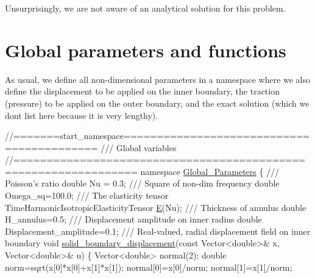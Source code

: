 Unsurprisingly, we are not aware of an analytical solution for this problem.



 

\hypertarget{index_namespace}{}\section{Global parameters and functions}\label{index_namespace}
As usual, we define all non-\/dimensional parameters in a namespace where we also define the displacement to be applied on the inner boundary, the traction (pressure) to be applied on the outer boundary, and the exact solution (which we don\textquotesingle{}t list here because it is very lengthy).

 
\begin{DoxyCodeInclude}
\textcolor{comment}{//=======start\_namespace==========================================}
\textcolor{comment}{/// Global variables}
\textcolor{comment}{}\textcolor{comment}{//================================================================}
\textcolor{keyword}{namespace }\hyperlink{namespaceGlobal__Parameters}{Global\_Parameters}
\{
\textcolor{comment}{}
\textcolor{comment}{ /// Poisson's ratio}
\textcolor{comment}{} \textcolor{keywordtype}{double} Nu = 0.3;
\textcolor{comment}{}
\textcolor{comment}{ /// Square of non-dim frequency}
\textcolor{comment}{} \textcolor{keywordtype}{double} Omega\_sq=100.0;
  \textcolor{comment}{}
\textcolor{comment}{ /// The elasticity tensor}
\textcolor{comment}{} TimeHarmonicIsotropicElasticityTensor \hyperlink{namespaceGlobal__Parameters_aeeb26e11ef275bdfce14710e00290bb6}{E}(Nu);
 \textcolor{comment}{}
\textcolor{comment}{ /// Thickness of annulus}
\textcolor{comment}{} \textcolor{keywordtype}{double} H\_annulus=0.5;
\textcolor{comment}{}
\textcolor{comment}{ /// Displacement amplitude on inner radius}
\textcolor{comment}{} \textcolor{keywordtype}{double} Displacement\_amplitude=0.1;
\textcolor{comment}{}
\textcolor{comment}{ /// Real-valued, radial displacement field on inner boundary}
\textcolor{comment}{} \textcolor{keywordtype}{void} \hyperlink{namespaceGlobal__Parameters_a95af753fa152ac6013bc4f640816f7ce}{solid\_boundary\_displacement}(\textcolor{keyword}{const} Vector<double>& x,
                                  Vector<double>& u)
 \{
  Vector<double> normal(2);
  \textcolor{keywordtype}{double} norm=sqrt(x[0]*x[0]+x[1]*x[1]);
  normal[0]=x[0]/norm;
  normal[1]=x[1]/norm;


\end{DoxyCodeInclude}

